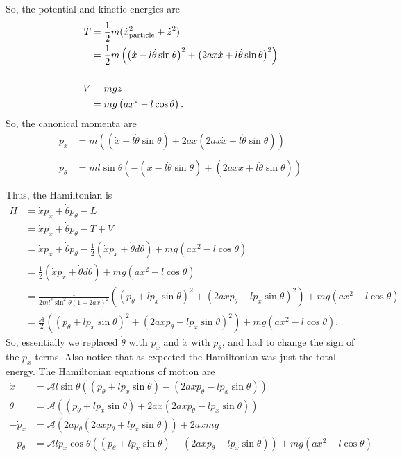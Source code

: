 \documentclass[10pt]{article}
\begin{document}
So, the potential and kinetic energies are
\begin{align*}
  T &= \frac{1}{2}m(\dot x_{\rm{particle}}^2 + \dot z^2)\\
    &= \frac{1}{2}m\left( \left(\dot x-l\dot\theta\sin\theta  \right)^2 + \left(2ax\dot x+l\dot\theta\sin\theta  \right)^2  \right)\\
    \\
  V &= mgz\\
    &= mg\left( ax^2-l\cos\theta \right).
\end{align*}
So, the canonical momenta are
\begin{align*}
  p_{x} &= 
    m\left( \left(\dot x-l\dot\theta\sin\theta  \right) + 2ax\left(2ax\dot x+l\dot\theta\sin\theta  \right)  \right)\\
    \\
  p_{\theta} &= 
    ml\sin\theta\left( -\left(\dot x-l\dot\theta\sin\theta  \right) + \left(2ax\dot x+l\dot\theta\sin\theta  \right)  \right)\\
    \\
\end{align*}
Thus, the Hamiltonian is
\begin{align*}
  H &= \dot x p_x + \dot\theta p_{\theta} - L\\
    &= \dot x p_x + \dot\theta p_{\theta} - T + V\\
    &= \dot x p_x + \dot\theta p_{\theta} - \frac{1}{2}\left( \dot x p_x + \dot\theta d\theta \right) + mg\left( ax^2-l\cos\theta \right)\\
    &= \frac{1}{2}\left( \dot x p_x + \dot\theta d\theta \right) + mg\left( ax^2-l\cos\theta \right)\\
    &= \frac{1}{2ml^2\sin^2\theta(1+2ax)^2}\left( \left(p_{\theta}+lp_x\sin\theta  \right)^2 + \left(2axp_{\theta}-lp_x\sin\theta  \right)^2  \right) + mg\left( ax^2-l\cos\theta \right)\\
    &= \frac{\mathcal{A}}{2}\left( \left(p_{\theta}+lp_x\sin\theta  \right)^2 + \left(2axp_{\theta}-lp_x\sin\theta  \right)^2  \right) + mg\left( ax^2-l\cos\theta \right).
\end{align*}
So, essentially we replaced $\dot\theta$ with $p_x$ and $\dot x$ with $p_{\theta}$, and had to change the sign of the $p_x$ terms.
Also notice that as expected the Hamiltonian was just the total energy. The Hamiltonian equations of motion are
\begin{align*}
  \dot x &= \mathcal{A}l\sin\theta\left(\left(p_{\theta}+lp_x\sin\theta  \right) - \left(2axp_{\theta}-lp_x\sin\theta  \right)  \right)\\
  \dot \theta &= \mathcal{A}\left(\left(p_{\theta}+lp_x\sin\theta  \right) + 2ax \left(2axp_{\theta}-lp_x\sin\theta  \right)  \right)\\
  -\dot p_x &= \mathcal{A}\left( 2ap_{\theta}\left(2axp_{\theta}+lp_x\sin\theta  \right)  \right) + 2axmg\\
  -\dot p_{\theta} &= \mathcal{A}lp_x\cos\theta\left( \left(p_{\theta}+lp_x\sin\theta  \right) - \left(2axp_{\theta}-lp_x\sin\theta  \right)  \right)+ mg\left( ax^2-l\cos\theta \right)
\end{align*}
\end{document}
